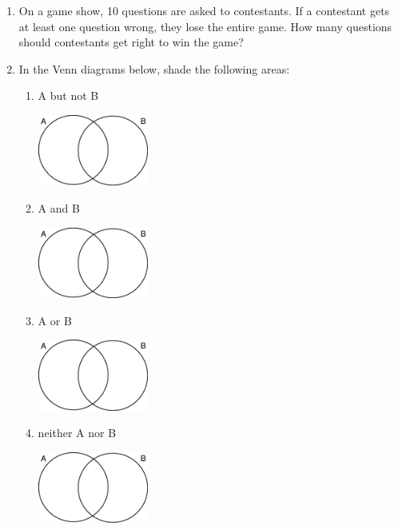 \documentclass[12pt]{article}
\begin{document}
\begin{enumerate}
\item On a game show, 10 questions are asked to contestants. If a contestant gets at least one question wrong, they lose the entire game. How many questions should contestants get right to win the game? \\

\pagebreak

\item In the Venn diagrams below, shade the following areas:

\begin{multicols}{2}
\begin{enumerate}
\item A but not B

\includegraphics[width=0.3\textwidth]{venn.gif}

\item A and B

\includegraphics[width=0.3\textwidth]{venn.gif}

\item A or B

\includegraphics[width=0.3\textwidth]{venn.gif}

\item neither A nor B

\includegraphics[width=0.3\textwidth]{venn.gif}

\end{enumerate}
\end{multicols}


\end{enumerate}
\end{document}
